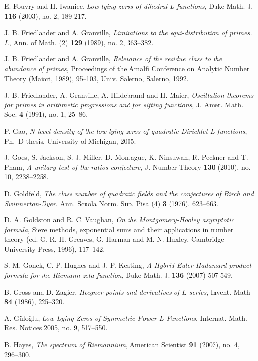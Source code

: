 \documentclass[12pt,reqno]{amsart}
\numberwithin{equation}{section}
\theoremstyle{plain}
\begin{document}
\begin{thebibliography}{GJMMNPPV}
E. Fouvry and H. Iwaniec, \emph{Low-lying zeros of dihedral $L$-functions}, Duke Math. J.  \textbf{116} (2003),  no. 2, 189-217.

 J. B. Friedlander and A. Granville, \emph{Limitations to the equi-distribution of primes. I.}, Ann. of Math. (2) \textbf{129} (1989), no. 2, 363--382.

 J. B. Friedlander and A. Granville, \emph{Relevance of the residue class to the abundance of primes}, Proceedings of the Amalfi Conference on Analytic Number Theory (Maiori, 1989), 95--103, Univ. Salerno, Salerno, 1992.

 J. B. Friedlander, A. Granville, A. Hildebrand and H. Maier, \emph{Oscillation theorems for primes in arithmetic progressions and for sifting functions}, J. Amer. Math. Soc. \textbf{4} (1991), no. 1, 25--86.

\newblock P. Gao, \emph{$N$-level density of the low-lying zeros of
quadratic Dirichlet $L$-functions}, Ph.~D thesis, University of
Michigan, 2005.

 J. Goes, S. Jackson, S. J. Miller, D. Montague, K. Ninsuwan, R. Peckner and T. Pham, \emph{A unitary test of the ratios conjecture}, J. Number Theory \textbf{130} (2010), no. 10, 2238--2258.

\newblock D. Goldfeld, \emph{The class number of quadratic fields and the conjectures of Birch and Swinnerton-Dyer}, Ann. Scuola Norm. Sup. Pisa (4) \textbf{3} (1976), 623--663.

 D. A. Goldston and R. C. Vaughan, \emph{On the
Montgomery-Hooley asymptotic formula}, Sieve methods, exponential
sums and their applications in number theory (ed. G. R. H.
Greaves, G. Harman and M. N. Huxley, Cambridge University Press,
1996), 117--142.

S. M. Gonek, C. P. Hughes and J. P. Keating, \emph{A Hybrid Euler-Hadamard product formula for
the Riemann zeta function}, Duke Math. J. \textbf{136} (2007) 507-549.

\newblock B. Gross and D. Zagier, \emph{Heegner points and derivatives of $L$-series}, Invent. Math \textbf{84} (1986), 225--320.

\newblock A. G\"ulo\u{g}lu, \emph{Low-Lying Zeros of Symmetric
Power $L$-Functions}, Internat. Math. Res. Notices 2005, no. 9,
517--550.

B. Hayes, \emph{The spectrum of Riemannium}, American Scientist
\textbf{91} (2003), no. 4, 296--300.


\end{thebibliography}
\end{document}

